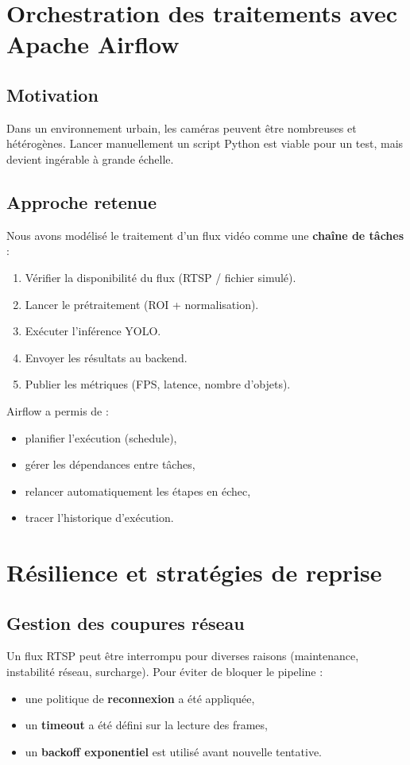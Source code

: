 \section{Orchestration des traitements avec Apache Airflow}
\subsection{Motivation}
Dans un environnement urbain, les caméras peuvent être nombreuses et hétérogènes. Lancer manuellement un script Python est viable pour un test, mais devient ingérable à grande échelle.

\subsection{Approche retenue}
Nous avons modélisé le traitement d’un flux vidéo comme une \textbf{chaîne de tâches} :
\begin{enumerate}
    \item Vérifier la disponibilité du flux (RTSP / fichier simulé).
    \item Lancer le prétraitement (ROI + normalisation).
    \item Exécuter l’inférence YOLO.
    \item Envoyer les résultats au backend.
    \item Publier les métriques (FPS, latence, nombre d’objets).
\end{enumerate}

Airflow a permis de :
\begin{itemize}
    \item planifier l’exécution (schedule),
    \item gérer les dépendances entre tâches,
    \item relancer automatiquement les étapes en échec,
    \item tracer l’historique d’exécution.
\end{itemize}

\section{Résilience et stratégies de reprise}
\subsection{Gestion des coupures réseau}
Un flux RTSP peut être interrompu pour diverses raisons (maintenance, instabilité réseau, surcharge). Pour éviter de bloquer le pipeline :
\begin{itemize}
    \item une politique de \textbf{reconnexion} a été appliquée,
    \item un \textbf{timeout} a été défini sur la lecture des frames,
    \item un \textbf{backoff exponentiel} est utilisé avant nouvelle tentative.
\end{itemize}


